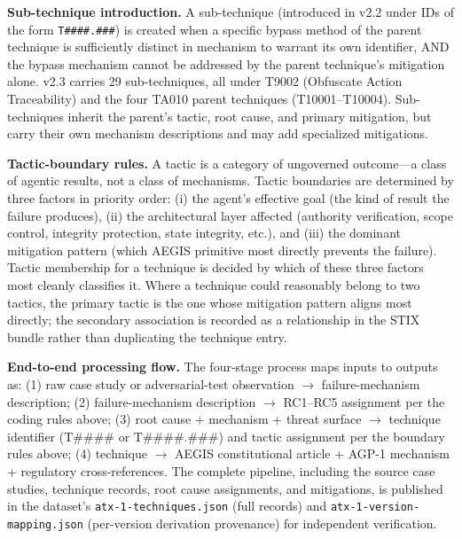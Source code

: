 \documentclass{IEEEoj-data}
\newcommand{\added}[1]{#1}
\begin{document}
\added{{\bf Sub-technique introduction.} A sub-technique (introduced in v2.2 under IDs of the form \texttt{T\#\#\#\#.\#\#\#}) is created when a specific bypass method of the parent technique is sufficiently distinct in mechanism to warrant its own identifier, AND the bypass mechanism cannot be addressed by the parent technique's mitigation alone. v2.3 carries 29 sub-techniques, all under T9002 (Obfuscate Action Traceability) and the four TA010 parent techniques (T10001--T10004). Sub-techniques inherit the parent's tactic, root cause, and primary mitigation, but carry their own mechanism descriptions and may add specialized mitigations.}

\added{{\bf Tactic-boundary rules.} A tactic is a category of ungoverned outcome---a class of agentic results, not a class of mechanisms. Tactic boundaries are determined by three factors in priority order: (i) the agent's effective goal (the kind of result the failure produces), (ii) the architectural layer affected (authority verification, scope control, integrity protection, state integrity, etc.), and (iii) the dominant mitigation pattern (which AEGIS primitive most directly prevents the failure). Tactic membership for a technique is decided by which of these three factors most cleanly classifies it. Where a technique could reasonably belong to two tactics, the primary tactic is the one whose mitigation pattern aligns most directly; the secondary association is recorded as a relationship in the STIX bundle rather than duplicating the technique entry.}

\added{{\bf End-to-end processing flow.} The four-stage process maps inputs to outputs as: (1) raw case study or adversarial-test observation $\rightarrow$ failure-mechanism description; (2) failure-mechanism description $\rightarrow$ RC1--RC5 assignment per the coding rules above; (3) root cause + mechanism + threat surface $\rightarrow$ technique identifier (T\#\#\#\# or T\#\#\#\#.\#\#\#) and tactic assignment per the boundary rules above; (4) technique $\rightarrow$ AEGIS constitutional article + AGP-1 mechanism + regulatory cross-references. The complete pipeline, including the source case studies, technique records, root cause assignments, and mitigations, is published in the dataset's \texttt{atx-1-techniques.json} (full records) and \texttt{atx-1-version-mapping.json} (per-version derivation provenance) for independent verification.}
\end{document}
